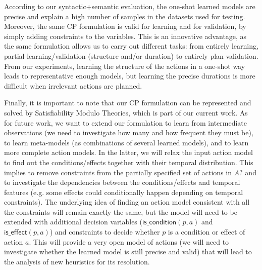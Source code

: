 \documentclass[10pt,journal,compsoc]{IEEEtran}
\begin{document}
According to our syntactic+semantic evaluation, the one-shot learned models are precise and explain a high number of samples in the datasets used for testing. Moreover, the same CP formulation is valid for learning and for validation, by simply adding constraints to the variables. This is an innovative advantage, as the same formulation allows us to carry out different tasks: from entirely learning, partial learning/validation (structure and/or duration) to entirely plan validation.
From our experiments, learning the structure of the actions in a one-shot way leads to representative enough models, but learning the precise durations is more difficult when irrelevant actions are planned.



Finally, it is important to note that our CP formulation can be represented and solved by Satisfiability Modulo Theories, which is part of our current work. As for future work, we want to extend our formulation to learn from intermediate observations (we need to investigate how many and how frequent they must be), to learn meta-models (as combinations of several learned models), and to learn more complete action models.
In the latter, we will relax the input action model to find out the conditions/effects together with their temporal distribution.
This implies to remove constraints from the partially specified set of actions in $A?$ and to investigate the dependencies between the conditions/effects and temporal features (e.g. some effects could conditionally happen depending on temporal constraints).
The underlying idea of finding an action model consistent with all the constraints will remain exactly the same, but the model will need to be extended with additional decision variables ($\mathsf{is\_condition}(p,a)$ and $\mathsf{is\_effect}(p,a)$) and constraints to decide whether $p$ is a condition or effect of action $a$. This will provide a very open model of actions (we will need to investigate whether the learned model is still precise and valid) that will lead to the analysis of new heuristics for its resolution.



\end{document}
